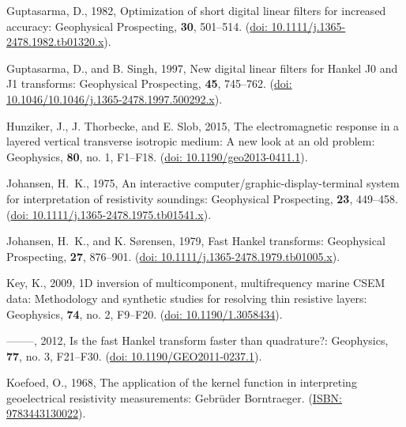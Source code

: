 \documentclass[paper,twocolumn,twoside]{geophysics}
\begin{document}
\begin{thebibliography}{}
Guptasarma, D.,  1982, Optimization of short digital linear filters for
  increased accuracy: Geophysical Prospecting, {\bf 30}, 501--514.
\newblock (\href{https://doi.org/10.1111/j.1365-2478.1982.tb01320.x}{doi:
  10.1111/j.1365-2478.1982.tb01320.x}).

Guptasarma, D., and B. Singh,  1997, New digital linear filters for {H}ankel
  {J}0 and {J}1 transforms: Geophysical Prospecting, {\bf 45}, 745--762.
\newblock (\href{https://doi.org/10.1046/j.1365-2478.1997.500292.x}{doi:
  10.1046/10.1046/j.1365-2478.1997.500292.x}).

Hunziker, J., J. Thorbecke, and E. Slob,  2015, The electromagnetic response in
  a layered vertical transverse isotropic medium: {A} new look at an old
  problem: Geophysics, {\bf 80}, no. 1, F1--F18.
\newblock (\href{https://doi.org/10.1190/geo2013-0411.1}{doi:
  10.1190/geo2013-0411.1}).

Johansen, H.~K.,  1975, An interactive computer/graphic-display-terminal system
  for interpretation of resistivity soundings: Geophysical Prospecting, {\bf
  23}, 449--458.
\newblock (\href{https://doi.org/10.1111/j.1365-2478.1975.tb01541.x}{doi:
  10.1111/j.1365-2478.1975.tb01541.x}).

Johansen, H.~K., and K. Sørensen,  1979, Fast {H}ankel transforms: Geophysical
  Prospecting, {\bf 27}, 876--901.
\newblock (\href{https://doi.org/10.1111/j.1365-2478.1979.tb01005.x}{doi:
  10.1111/j.1365-2478.1979.tb01005.x}).

Key, K.,  2009, {1D} inversion of multicomponent, multifrequency marine {CSEM}
  data: {M}ethodology and synthetic studies for resolving thin resistive
  layers: Geophysics, {\bf 74}, no. 2, F9--F20.
\newblock (\href{https://doi.org/10.1190/1.3058434}{doi: 10.1190/1.3058434}).

--------, 2012, Is the fast {H}ankel transform faster than quadrature?:
  Geophysics, {\bf 77}, no. 3, F21--F30.
\newblock (\href{https://doi.org/10.1190/GEO2011-0237.1}{doi:
  10.1190/GEO2011-0237.1}).

Koefoed, O.,  1968, The application of the kernel function in interpreting
  geoelectrical resistivity measurements: Gebrüder Borntraeger.
\newblock (\href{https://isbnsearch.org/isbn/9783443130022}{{I}SBN:
  9783443130022}).


\end{thebibliography}
\end{document}
